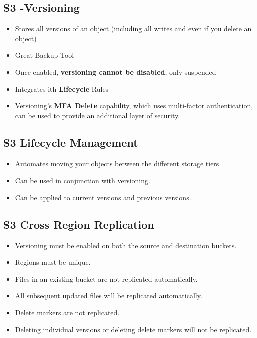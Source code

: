 \documentclass{article}
\begin{document}
	\subsection{S3 -Versioning}
	\begin{itemize}
	\item
	Stores all versions of an object (including all writes and even if you delete an object)
	
	\item
	Great Backup Tool
	
	\item
	Once enabled, \textbf{versioning cannot be disabled}, only suspended
	
	\item
	Integrates ith \textbf{Lifecycle} Rules
	
	\item
	Versioning's \textbf{MFA Delete} capability, which uses multi-factor authentication, can be used to provide an additional layer of security.
	\end{itemize}
	
	\subsection{S3 Lifecycle Management}
	\begin{itemize}
	\item
	Automates moving your objects between the different storage tiers.
	
	\item
	Can be used in conjunction with versioning.
	
	\item
	Can be applied to current versions and previous versions.
	\end{itemize}
	
	\subsection{S3 Cross Region Replication}
	\begin{itemize}
	\item
	Versioning must be enabled on both the source and destination buckets.
	
	\item
	Regions must be unique.
	
	\item
	Files in an existing bucket are not replicated automatically.
	
	\item
	All subsequent updated files will be replicated automatically.
	
	\item
	Delete markers are not replicated.
	
	\item
	Deleting individual versions or deleting delete markers will not be replicated.
	\end{itemize}
	
\end{document}
